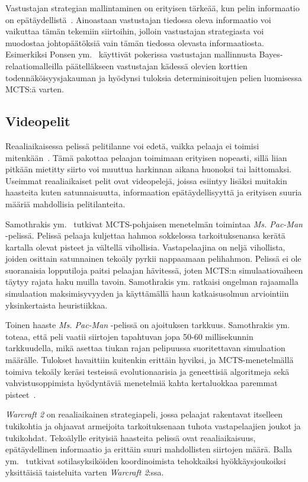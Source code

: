 \documentclass[12pt,finnish]{tktltiki2}
\theoremstyle{definition}
\theoremstyle{remark}
\begin{document}
Vastustajan strategian mallintaminen on erityisen tärkeää, kun pelin informaatio on epätäydellistä~\cite{browne}. Ainoastaan vastustajan tiedossa oleva informaatio voi vaikuttaa tämän tekemiin siirtoihin, jolloin vastustajan strategiasta voi muodostaa johtopäätöksiä vain tämän tiedossa olevasta informaatiosta. Esimerkiksi Ponsen ym.~\cite{ponsen} käyttivät pokerissa vastustajan mallinnusta Bayes-relaatiomalleilla päätelläkseen vastustajan kädessä olevien korttien todennäköisyysjakauman ja hyödynsi tuloksia determinisoitujen pelien luomisessa MCTS:ä varten.

\subsection{Videopelit}

Reaaliaikaisessa pelissä pelitilanne voi edetä, vaikka pelaaja ei toimisi mitenkään~\cite{browne}. Tämä pakottaa pelaajan toimimaan erityisen nopeasti, sillä liian pitkään mietitty siirto voi muuttua harkinnan aikana huonoksi tai laittomaksi. Useimmat reaaliaikaiset pelit ovat videopelejä, joissa esiintyy lisäksi muitakin haasteita kuten satunnaisuutta, informaation epätäydellisyyttä ja erityisen suuria määriä mahdollisia pelitilanteita.

Samothrakis ym.~\cite{samothrakis} tutkivat MCTS-pohjaisen menetelmän toimintaa \textit{Ms. Pac-Man} -pelissä. Pelissä pelaaja kuljettaa hahmoa sokkelossa tarkoituksenansa kerätä kartalla olevat pisteet ja vältellä vihollisia. Vastapelaajina on neljä vihollista, joiden osittain satunnainen tekoäly pyrkii nappaamaan pelihahmon. Pelissä ei ole suoranaisia lopputiloja paitsi pelaajan hävitessä, joten MCTS:n simulaatiovaiheen täytyy rajata haku muilla tavoin. Samothrakis ym. ratkaisi ongelman rajaamalla simulaation maksimisyvyyden ja käyttämällä haun katkaisusolmun arviointiin yksinkertaista heuristiikkaa.

Toinen haaste \textit{Ms. Pac-Man} -pelissä on ajoituksen tarkkuus. Samothrakis ym. toteaa, että peli vaatii siirtojen tapahtuvan jopa 50-60 millisekunnin tarkkuudella, mikä asettaa tiukan rajan pelipuussa suoritettavan simulaation määrälle. Tulokset havaittiin kuitenkin erittäin hyviksi, ja MCTS-menetelmällä toimiva tekoäly keräsi testeissä evolutionaarisia ja geneettisiä algoritmeja sekä vahvistusoppimista hyödyntäviä menetelmiä kahta kertaluokkaa paremmat pisteet~\cite{samothrakis}.

\textit{Warcraft 2} on reaaliaikainen strategiapeli, jossa pelaajat rakentavat itselleen tukikohtia ja ohjaavat armeijoita tarkoituksenaan tuhota vastapelaajien joukot ja tukikohdat. Tekoälylle erityisiä haasteita pelissä ovat reaaliaikaisuus, epätäydellinen informaatio ja erittäin suuri mahdollisten siirtojen määrä. Balla ym.~\cite{balla} tutkivat sotilasyksiköiden koordinoimista tehokkaiksi hyökkäysjoukoiksi yksittäisiä taisteluita varten \textit{Warcraft 2}:ssa.
\end{document}
